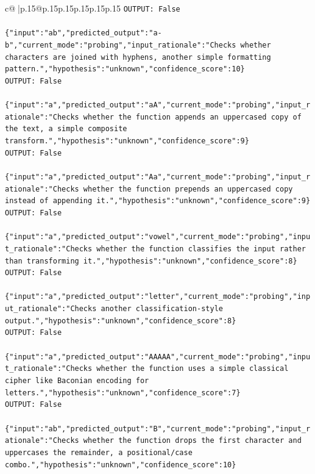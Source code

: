 \documentclass{article}
\begin{document}
{\begin{supertabular}{c@{$\;$}|p{.15\linewidth}@{}p{.15\linewidth}p{.15\linewidth}p{.15\linewidth}p{.15\linewidth}p{.15\linewidth}}
{{{\texttt{OUTPUT: False} \\
\\ 
\texttt{\{"input":"ab","predicted\_output":"a{-}b","current\_mode":"probing","input\_rationale":"Checks whether characters are joined with hyphens, another simple formatting pattern.","hypothesis":"unknown","confidence\_score":10\}} \\
\texttt{OUTPUT: False} \\
\\ 
\texttt{\{"input":"a","predicted\_output":"aA","current\_mode":"probing","input\_rationale":"Checks whether the function appends an uppercased copy of the text, a simple composite transform.","hypothesis":"unknown","confidence\_score":9\}} \\
\texttt{OUTPUT: False} \\
\\ 
\texttt{\{"input":"a","predicted\_output":"Aa","current\_mode":"probing","input\_rationale":"Checks whether the function prepends an uppercased copy instead of appending it.","hypothesis":"unknown","confidence\_score":9\}} \\
\texttt{OUTPUT: False} \\
\\ 
\texttt{\{"input":"a","predicted\_output":"vowel","current\_mode":"probing","input\_rationale":"Checks whether the function classifies the input rather than transforming it.","hypothesis":"unknown","confidence\_score":8\}} \\
\texttt{OUTPUT: False} \\
\\ 
\texttt{\{"input":"a","predicted\_output":"letter","current\_mode":"probing","input\_rationale":"Checks another classification{-}style output.","hypothesis":"unknown","confidence\_score":8\}} \\
\texttt{OUTPUT: False} \\
\\ 
\texttt{\{"input":"a","predicted\_output":"AAAAA","current\_mode":"probing","input\_rationale":"Checks whether the function uses a simple classical cipher like Baconian encoding for letters.","hypothesis":"unknown","confidence\_score":7\}} \\
\texttt{OUTPUT: False} \\
\\ 
\texttt{\{"input":"ab","predicted\_output":"B","current\_mode":"probing","input\_rationale":"Checks whether the function drops the first character and uppercases the remainder, a positional/case combo.","hypothesis":"unknown","confidence\_score":10\}} \\
}}}
\end{supertabular}}
\end{document}
